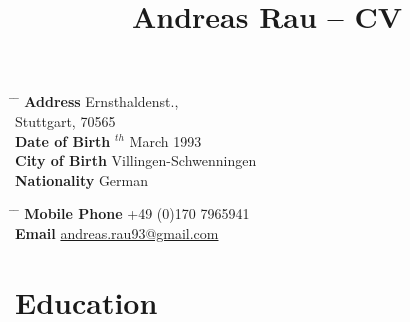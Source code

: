 \documentclass[10pt]{article} %
\begin{document}

\title{Andreas Rau -- CV} %


\parbox{0.5\textwidth}
{ %
	\begin{tabbing} %
		\hspace{3cm} \= \hspace{4cm} \= \kill %
		{\bf Address}  Ernsthaldenst.,\\ %
		\> Stuttgart, 70565 \\ %
		{\bf Date of Birth} $^{th}$ March 1993 \\ %
		{\bf City of Birth} \> Villingen-Schwenningen\\ %
		{\bf Nationality} \> German %
	\end{tabbing}
}
\hfill %
\parbox{0.5\textwidth}
{ %
	\begin{tabbing} %
		\hspace{3cm} \= \hspace{4cm} \= \kill %
		{\bf Mobile Phone} \> +49 (0)170 7965941 \\ %
		{\bf Email} \> \href{mailto:andreas.rau93@gmail.com}{andreas.rau93@gmail.com} \\ %
	\end{tabbing}
}


\section{Education}

\end{document}
